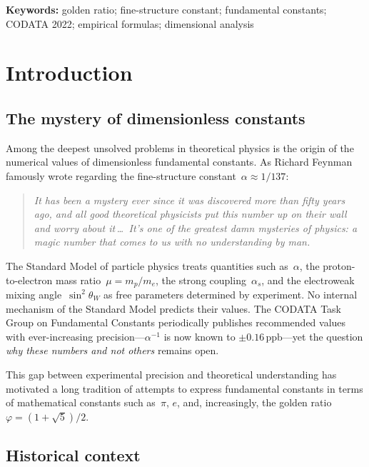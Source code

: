 \documentclass[11pt,a4paper]{article}
\newcommand{\vp}{\varphi}
\newcommand{\ppb}{\,\mathrm{ppb}}
\begin{document}
\medskip
\noindent\textbf{Keywords:} golden ratio; fine-structure constant; fundamental
constants; CODATA 2022; empirical formulas; dimensional analysis

\section{Introduction}\label{sec:intro}

\subsection*{The mystery of dimensionless constants}

Among the deepest unsolved problems in theoretical physics is the origin of the
numerical values of dimensionless fundamental constants. As Richard
Feynman~\cite{feynman1985} famously wrote regarding the fine-structure
constant~$\alpha\approx 1/137$:
\begin{quote}
\itshape
It has been a mystery ever since it was discovered more than fifty years ago,
and all good theoretical physicists put this number up on their wall and worry
about it\,\ldots\, It's one of the greatest damn mysteries of physics: a magic
number that comes to us with no understanding by man.
\end{quote}
The Standard Model of particle physics treats quantities such
as~$\alpha$, the proton-to-electron mass ratio~$\mu=m_p/m_e$, the strong
coupling~$\alpha_s$, and the electroweak mixing angle~$\sin^{2}\!\theta_W$ as
free parameters determined by experiment. No internal mechanism of the Standard
Model predicts their values. The CODATA Task Group on Fundamental Constants
periodically publishes recommended values~\cite{codata2022} with ever-increasing
precision---$\alpha^{-1}$ is now known to $\pm 0.16\ppb$---yet the question
\emph{why these numbers and not others} remains open.

This gap between experimental precision and theoretical understanding has
motivated a long tradition of attempts to express fundamental constants in terms
of mathematical constants such as~$\pi$, $e$, and, increasingly, the golden
ratio~$\vp=(1+\sqrt{5})/2$.

\subsection*{Historical context}
\end{document}
